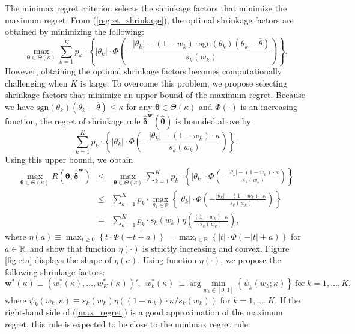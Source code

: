 \documentclass[12pt,a4paper]{article}
\begin{document}
The minimax regret criterion selects the shrinkage factors that minimize the maximum regret. From (\ref{regret_shrinkage}), the optimal shrinkage factors are obtained by minimizing the following:
\[
\max_{\bm{\theta} \in \Theta(\kappa)} \sum_{k=1}^K p_k \cdot \left\{ |\theta_k| \cdot  \Phi \left( -   \frac{|\theta_k| - (1-w_k) \cdot \text{sgn}(\theta_k) (\theta_k - \overline{\theta})}{s_k(w_k)} \right) \right\}.
\]
However, obtaining the optimal shrinkage factors becomes computationally challenging when $K$ is large. To overcome this problem, we propose selecting shrinkage factors that minimize an upper bound of the maximum regret. Because we have $\text{sgn}(\theta_k) (\theta_k - \overline{\theta}) \leq \kappa$ for any $\bm{\theta} \in \Theta(\kappa)$ and $\Phi(\cdot)$ is an increasing function, the regret of shrinkage rule $\hat{\bm{\delta}}^{\bm{w}}(\hat{\bm{\theta}})$ is bounded above by
\begin{equation}
\sum_{k=1}^K p_k \cdot \left\{ |\theta_k| \cdot  \Phi \left( -   \frac{|\theta_k| - (1-w_k) \cdot \kappa}{s_k(w_k)} \right) \right\}. \label{upper_bound_regret}
\end{equation}
Using this upper bound, we obtain
\begin{eqnarray}
\max_{\bm{\theta} \in \Theta(\kappa)} R(\bm{\theta},\hat{\bm{\delta}}^{\bm{w}}) & \leq & \max_{\bm{\theta} \in \Theta(\kappa)} \sum_{k=1}^K p_k \cdot \left\{ |\theta_k| \cdot  \Phi \left( -   \frac{|\theta_k| - (1-w_k) \cdot \kappa}{s_k(w_k)} \right) \right\} \nonumber \\
&\leq & \sum_{k=1}^K p_k \cdot \max_{\theta_k \in \mathbb{R}} \left\{ |\theta_k| \cdot  \Phi \left( -   \frac{|\theta_k| - (1-w_k) \cdot \kappa}{s_k(w_k)} \right) \right\} \nonumber \\
&=& \sum_{k=1}^K p_k \cdot s_k(w_k) \eta \left( \frac{(1-w_k) \cdot \kappa}{s_k(w_k)} \right), \label{max_regret}
\end{eqnarray}
where $\eta(a) \equiv \max_{t \geq 0} \left\{ t \cdot \Phi(-t+a) \right\} = \max_{t \in \mathbb{R}} \left\{ |t| \cdot \Phi(-|t|+a) \right\}$ for $a \in \mathbb{R}$. \cite{tetenov2012statistical} and \cite{ishihara2021evidence} show that function $\eta(\cdot)$ is strictly increasing and convex. Figure \ref{fig:eta} displays the shape of $\eta(a)$. Using function $\eta(\cdot)$, we propose the following shrinkage factors:
\begin{equation}
\bm{w}^{\ast}(\kappa) \equiv \left(w_1^{\ast}(\kappa), \ldots, w_K^{\ast}(\kappa) \right)', \ \  w_k^{\ast}(\kappa) \ \equiv \ \text{arg} \min_{w_k \in [0,1]} \left\{ \psi_k(w_k;\kappa) \right\} \ \text{for} \ k =1, \ldots, K, \label{optimal_shrinkage_factor}
\end{equation}
where $\psi_k(w_k;\kappa) \equiv s_k(w_k) \eta \left( (1-w_k) \cdot \kappa/s_k(w_k) \right)$ for $k = 1, \ldots, K$. If the right-hand side of (\ref{max_regret}) is a good approximation of the maximum regret, this rule is expected to be close to the minimax regret rule.
\end{document}
